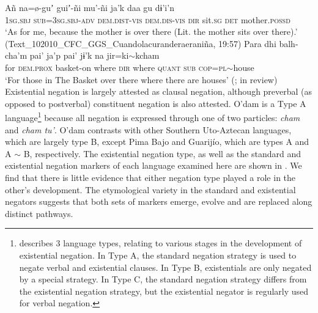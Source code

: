 \documentclass[output=paper]{langsci/langscibook}
\begin{document}
\ea
\label{ex:odam-intromom}
\gll Añ 		na=\o-guʼ 		guiʼ-ñi 			mu’-ñi 	ja’k	daa gu 	dɨ’i’n\\
	\textsc{1sg.sbj} 	\textsc{sub=3sg.sbj-adv} 	\textsc{dem.dist-vis} 	\textsc{dem.dis-vis}	\textsc{dir} 	sit.\textsc{sg} \textsc{det}	mother.\textsc{possd}\\
\glt ‘As for me, because the mother is over there (Lit. the mother sits over there).’
(Text\_102010\_CFC\_GGS\_Cuandolacuranderaeraniña, 19:57)
\z 
\ea
\label{ex:odam-introbask}
\gll Para 	dhi 	balh-cha'm     		pai'  	ja'p 	pai'    	jɨ'k 	na	jir=ki$\sim$kcham\\
	for  	\textsc{dem.prox} 	basket-on 	where 	\textsc{dir} 	where  \textsc{quant} 	\textsc{sub} 	\textsc{cop=pl}$\sim$house\\
\glt ‘For those in The Basket over there where there are houses’ (\citeauthor{garciaeinrev}; in review)
\z
Existential negation is largely attested as clausal negation, although preverbal (as opposed to postverbal) constituent negation is also attested. O’dam is a Type A language\footnote{\citet{Croft1991} describes 3 language types, relating to various stages in the development of existential negation. In Type A, the standard negation strategy is used to negate verbal and existential clauses. In Type B, existentials are only negated by a special strategy. In Type C, the standard negation strategy differs from the existential negation strategy, but the existential negator is regularly used for verbal negation.} because all negation is expressed through one of two particles: \emph{cham} and \emph{cham tu’}. O’dam contrasts with other Southern Uto-Aztecan languages, which are largely type B, except Pima Bajo and Guarijío, which are types A and A $\sim$ B, respectively. The existential negation type, as well as the standard and existential negation markers of each language examined here are shown in . We find that there is little evidence that either negation type played a role in the other's development. The etymological variety in the standard and existential negators suggests that both sets of markers emerge, evolve and are replaced along distinct pathways.
\end{document}
